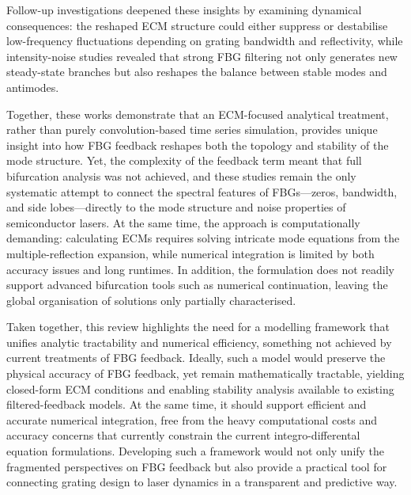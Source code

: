 Follow-up investigations deepened these insights by examining dynamical consequences: the reshaped ECM structure could either suppress or destabilise low-frequency fluctuations depending on grating bandwidth and reflectivity, while intensity-noise studies revealed that strong FBG filtering not only generates new steady-state branches but also reshapes the balance between stable modes and antimodes.
%
\par
%
Together, these works demonstrate that an ECM-focused analytical treatment, rather than purely convolution-based time series simulation, provides unique insight into how FBG feedback reshapes both the topology and stability of the mode structure.
Yet, the complexity of the feedback term meant that full bifurcation analysis was not achieved, and these studies remain the only systematic attempt to connect the spectral features of FBGs—zeros, bandwidth, and side lobes—directly to the mode structure and noise properties of semiconductor lasers.
At the same time, the approach is computationally demanding: calculating ECMs requires solving intricate mode equations from the multiple-reflection expansion, while numerical integration is limited by both accuracy issues and long runtimes.
In addition, the formulation does not readily support advanced bifurcation tools such as numerical continuation, leaving the global organisation of solutions only partially characterised.
%
\par
%
Taken together, this review highlights the need for a modelling framework that unifies analytic tractability and numerical efficiency, something not achieved by current treatments of FBG feedback.
Ideally, such a model would preserve the physical accuracy of FBG feedback, yet remain mathematically tractable, yielding closed-form ECM conditions and enabling stability analysis available to existing filtered-feedback models.
At the same time, it should support efficient and accurate numerical integration, free from the heavy computational costs and accuracy concerns that currently constrain the current integro-differental equation formulations.
Developing such a framework would not only unify the fragmented perspectives on FBG feedback but also provide a practical tool for connecting grating design to laser dynamics in a transparent and predictive way.


